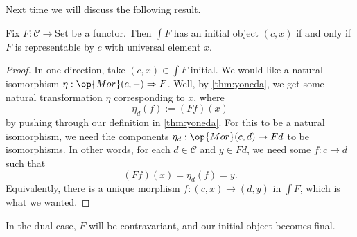 Next time we will discuss the following result.
\begin{proposition}
	Fix $F:\mathcal C\to\mathrm{Set}$ be a functor. Then $\int F$ has an initial object $(c,x)$ if and only if $F$ is representable by $c$ with universal element $x$.
\end{proposition}
\begin{proof}
	In one direction, take $(c,x)\in\int F$ initial. We would like a natural isomorphism $\eta:\op{Mor}(c,-)\Rightarrow F$. Well, by \autoref{thm:yoneda}, we get some natural transformation $\eta$ corresponding to $x$, where
	\[\eta_d(f):=(Ff)(x)\]
	by pushing through our definition in \autoref{thm:yoneda}. For this to be a natural isomorphism, we need the components $\eta_d:\op{Mor}(c,d)\to Fd$ to be isomorphisms. In other words, for each $d\in\mathcal C$ and $y\in Fd$, we need some $f:c\to d$ such that
	\[(Ff)(x)=\eta_d(f)=y.\]
	Equivalently, there is a unique morphism $f:(c,x)\to(d,y)$ in $\int F$, which is what we wanted.
\end{proof}
\begin{remark}
	In the dual case, $F$ will be contravariant, and our initial object becomes final.
\end{remark}
